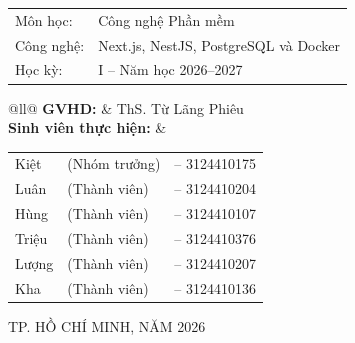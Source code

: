\documentclass[a4paper]{article}
\begin{document}
\begin{titlepage}
    \vspace{1.2cm}

    \begin{tabular}{@{}ll@{}}
        Môn học:
            & Công nghệ Phần mềm\\[6pt]
        Công nghệ:
            & Next.js, NestJS, PostgreSQL và Docker\\[6pt]
        Học kỳ:
            & I – Năm học 2026–2027\\
    \end{tabular}\par

    \vspace{1.5cm}

    \begin{tabular}{@{}ll@{}}
        \textbf{GVHD:}
            & ThS. Từ Lãng Phiêu\\[8pt]
        \textbf{Sinh viên thực hiện:}
            & \begin{tabular}[t]{@{}lll@{}}
                Kiệt & (Nhóm trưởng) & -- 3124410175 \\
                Luân & (Thành viên)  & -- 3124410204 \\
                Hùng & (Thành viên)  & -- 3124410107 \\
                Triệu & (Thành viên) & -- 3124410376 \\
                Lượng & (Thành viên) & -- 3124410207 \\
                Kha & (Thành viên)   & -- 3124410136 \\
              \end{tabular}
    \end{tabular}\par

    \vfill

    {\footnotesize TP. HỒ CHÍ MINH, NĂM 2026\par}

    \vspace{5mm}
\end{titlepage}

\hypersetup{pageanchor=true}

\tableofcontents
\clearpage

\end{document}

